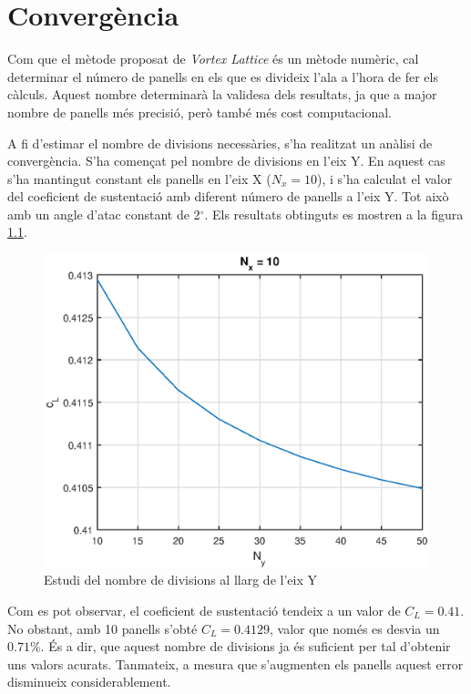 \chapter{Convergència}
Com que el mètode proposat de \textit{Vortex Lattice} és un mètode numèric, cal determinar el número de panells en els que es divideix l'ala a l'hora de fer els càlculs. Aquest nombre determinarà la validesa dels resultats, ja que a major nombre de panells més precisió, però també més cost computacional.

A fi d'estimar el nombre de divisions necessàries, s'ha realitzat un anàlisi de convergència. S'ha començat pel nombre de divisions en l'eix Y. En aquest cas s'ha mantingut constant els panells en l'eix X ($N_{x}=10$), i s'ha calculat el valor del coeficient de sustentació amb diferent número de panells a l'eix Y. Tot això amb un angle d'atac constant de 2$^{\circ}$. Els resultats obtinguts es mostren a la figura \ref{ny}.

\begin{figure}[H]
	\centering
	\includegraphics[scale=0.95]{./plots/nycl}
	\caption{Estudi del nombre de divisions al llarg de l'eix Y}
	\label{ny}
\end{figure}

Com es pot observar, el coeficient de sustentació tendeix a un valor de $C_{L}=0.41$. No obstant, amb 10 panells s'obté $C_{L}=0.4129$, valor que només es desvia un $0.71\%$. És a dir, que aquest nombre de divisions ja és suficient per tal d'obtenir uns valors acurats. Tanmateix, a mesura que s'augmenten els panells aquest error disminueix considerablement.

